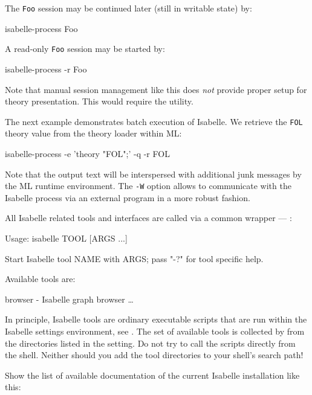 \begin{isabellebody}
\begin{isamarkuptext}
  The \verb|Foo| session may be continued later (still in
  writable state) by:
\begin{ttbox}
isabelle-process Foo
\end{ttbox}
  A read-only \verb|Foo| session may be started by:
\begin{ttbox}
isabelle-process -r Foo
\end{ttbox}

  \medskip Note that manual session management like this does
  \emph{not} provide proper setup for theory presentation.  This would
  require the \hyperlink{tool.usedir}{\mbox{}} utility.

  \bigskip The next example demonstrates batch execution of Isabelle.
  We retrieve the \verb|FOL| theory value from the theory loader
  within ML:
\begin{ttbox}
isabelle-process -e 'theory "FOL";' -q -r FOL
\end{ttbox}
  Note that the output text will be interspersed with additional junk
  messages by the ML runtime environment.  The \verb|-W| option
  allows to communicate with the Isabelle process via an external
  program in a more robust fashion.%
\end{isamarkuptext}%
\isamarkuptrue%
%
\isamarkuptrue%
%
\begin{isamarkuptext}%
All Isabelle related tools and interfaces are called via a common
  wrapper --- \hyperlink{executable.isabelle}{\mbox{}}:

\begin{ttbox}
Usage: isabelle TOOL [ARGS ...]

  Start Isabelle tool NAME with ARGS; pass "-?" for tool specific help.

  Available tools are:

    browser - Isabelle graph browser
    \dots
\end{ttbox}

  In principle, Isabelle tools are ordinary executable scripts that
  are run within the Isabelle settings environment, see
  .  The set of available tools is collected by
  \hyperlink{executable.isabelle}{\mbox{}} from the directories listed in the \hyperlink{setting.ISABELLE-TOOLS}{\mbox{}} setting.  Do not try to call the scripts directly
  from the shell.  Neither should you add the tool directories to your
  shell's search path!%
\end{isamarkuptext}%
\isamarkuptrue%
%
\isamarkuptrue%
%
\begin{isamarkuptext}%
Show the list of available documentation of the current Isabelle
  installation like this:


\end{isamarkuptext}
\end{isabellebody}
